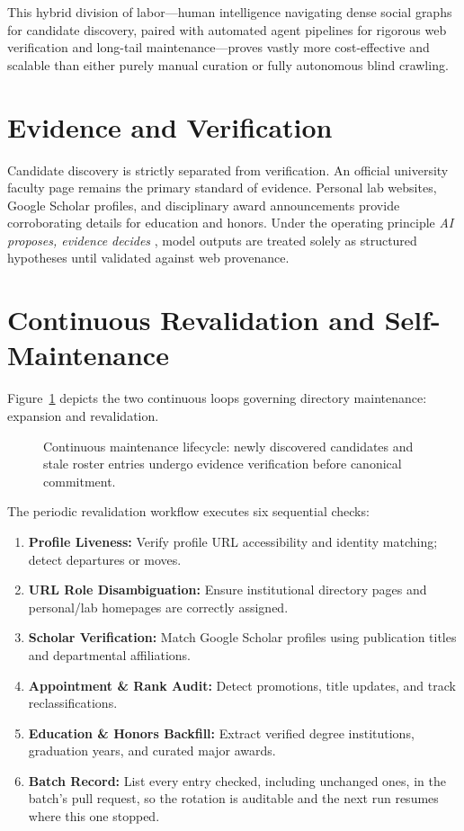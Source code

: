 \documentclass[11pt]{article}
\begin{document}
This hybrid division of labor---human intelligence navigating dense social graphs for candidate discovery, paired with automated agent pipelines for rigorous web verification and long-tail maintenance---proves vastly more cost-effective and scalable than either purely manual curation or fully autonomous blind crawling.

\section{Evidence and Verification}
\label{sec:evidence}
Candidate discovery is strictly separated from verification. An official university faculty page remains the primary standard of evidence. Personal lab websites, Google Scholar profiles, and disciplinary award announcements provide corroborating details for education and honors.
Under the operating principle \emph{AI proposes, evidence decides} \cite{amershi2014power}, model outputs are treated solely as structured hypotheses until validated against web provenance.

\section{Continuous Revalidation and Self-Maintenance}
\label{sec:maintenance}
Figure~\ref{fig:lifecycle} depicts the two continuous loops governing directory maintenance: expansion and revalidation.

\begin{figure}[t]
\centering

\caption{Continuous maintenance lifecycle: newly discovered candidates and stale roster entries undergo evidence verification before canonical commitment.}
\label{fig:lifecycle}
\end{figure}

The periodic revalidation workflow executes six sequential checks:
\begin{enumerate}
\item \textbf{Profile Liveness:} Verify profile URL accessibility and identity matching; detect departures or moves.
\item \textbf{URL Role Disambiguation:} Ensure institutional directory pages and personal/lab homepages are correctly assigned.
\item \textbf{Scholar Verification:} Match Google Scholar profiles using publication titles and departmental affiliations.
\item \textbf{Appointment \& Rank Audit:} Detect promotions, title updates, and track reclassifications.
\item \textbf{Education \& Honors Backfill:} Extract verified degree institutions, graduation years, and curated major awards.
\item \textbf{Batch Record:} List every entry checked, including unchanged ones, in the batch's pull request, so the rotation is auditable and the next run resumes where this one stopped.
\end{enumerate}
\end{document}
